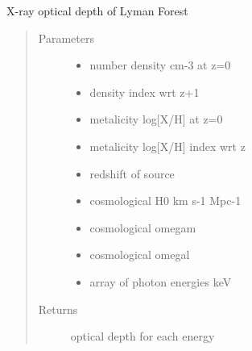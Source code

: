 \documentclass[letterpaper,10pt,english]{sphinxmanual}
\begin{document}

\begin{fulllineitems}
\label{\detokenize{astro_functions:astro.lyftau}}
X-ray optical depth of Lyman Forest
\begin{quote}\begin{description}
\item[{Parameters}] \leavevmode\begin{itemize}
\item {} 
 \textendash{} number density cm-3 at z=0

\item {} 
 \textendash{} density index wrt z+1

\item {} 
 \textendash{} metalicity log{[}X/H{]} at z=0

\item {} 
 \textendash{} metalicity log{[}X/H{]} index wrt z

\item {} 
 \textendash{} redshift of source

\item {} 
 \textendash{} cosmological H0 km s-1 Mpc-1

\item {} 
 \textendash{} cosmological omegam

\item {} 
 \textendash{} cosmological omegal

\item {} 
 \textendash{} array of photon energies keV

\end{itemize}

\item[{Returns}] \leavevmode
optical depth for each energy

\end{description}\end{quote}

\end{fulllineitems}
\end{document}
